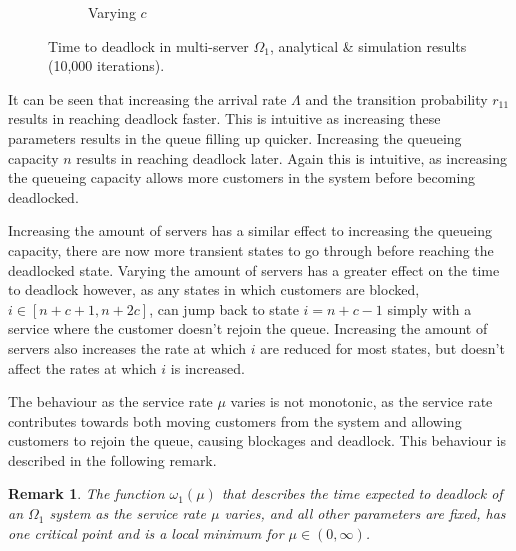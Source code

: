 \documentclass{article}
\newtheorem{remark}{Remark}
\numberwithin{equation}{section}
\begin{document}
\begin{figure}[!htbp]
\begin{center}
\begin{subfigure}[b]{0.35\textwidth}
    \caption{Varying $c$}
    \label{fig:1Nms_c}
  \end{subfigure}
  \end{center}
  \caption{Time to deadlock in multi-server $\Omega_1$, analytical \& simulation results (10,000 iterations).}
  \label{fig:timestodeadlock1nodemultiserver}
\end{figure}

It can be seen that increasing the arrival rate $\Lambda$ and the transition probability $r_{11}$ results in reaching deadlock faster.
This is intuitive as increasing these parameters results in the queue filling up quicker.
Increasing the queueing capacity $n$ results in reaching deadlock later.
Again this is intuitive, as increasing the queueing capacity allows more customers in the system before becoming deadlocked.

Increasing the amount of servers has a similar effect to increasing the queueing capacity, there are now more transient states to go through before reaching the deadlocked state.
Varying the amount of servers has a greater effect on the time to deadlock however, as any states in which customers are blocked, $i \in [n+c+1, n+2c]$, can jump back to state $i=n+c-1$ simply with a service where the customer doesn't rejoin the queue.
Increasing the amount of servers also increases the rate at which $i$ are reduced for most states, but doesn't affect the rates at which $i$ is increased.

The behaviour as the service rate $\mu$ varies is not monotonic, as the service rate contributes towards both moving customers from the system and allowing customers to rejoin the queue, causing blockages and deadlock.
This behaviour is described in the following remark.\\

\begin{remark}\label{rem:oneminima}
The function $\omega_1(\mu)$ that describes the time expected to deadlock of an $\Omega_1$ system as the service rate $\mu$ varies, and all other parameters are fixed, has one critical point and is a local minimum for $\mu \in (0, \infty)$.
\end{remark}
\end{document}
